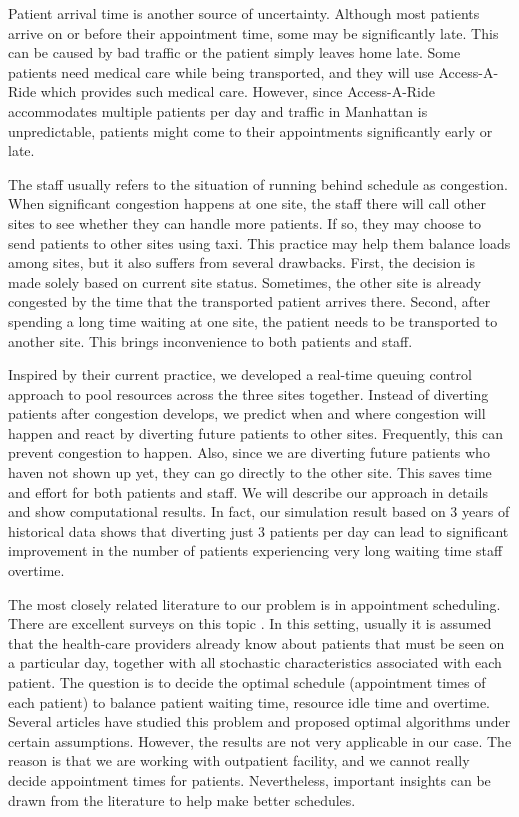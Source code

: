 Patient arrival time is another source of uncertainty. Although most
patients arrive on or before their appointment time, some may be
significantly late. This can be caused by bad traffic or the patient
simply leaves home late. Some patients need medical care while being
transported, and they will use Access-A-Ride which provides
such medical care. However, since Access-A-Ride accommodates
multiple patients per day and traffic in Manhattan is unpredictable,
patients might come to their appointments significantly early or late.

The staff usually refers to the situation of running behind schedule
as congestion. When significant congestion happens at one site, the staff there
will call other sites to see whether they can handle more patients. If so,
 they may choose to send patients to other sites using taxi. This practice
may help them balance loads among sites, but it also suffers from several
drawbacks. First, the decision is made solely based on current site status.
Sometimes, the other site is already congested by the time that the transported patient
arrives there. Second, after spending a long time waiting at one site, the patient
needs to be transported to another site. This brings inconvenience to both
patients and staff.

Inspired by their current practice, we developed a real-time queuing control
approach to pool resources across the three sites together. Instead of diverting
patients after congestion develops, we predict when and where congestion will
happen and react by diverting future patients to other sites. Frequently, this
can prevent congestion to happen. Also, since we are diverting future patients
who haven not shown up yet, they can go directly to the other site. This saves
time and effort for both patients and staff. We will describe our approach
in details and show computational results. In fact, our simulation result
based on 3 years of historical data shows that diverting just 3 patients per
day can lead to significant improvement in the number of patients experiencing
very long waiting time staff overtime.

The most closely related literature to our problem is in appointment scheduling.
There are excellent surveys on this topic \cite{gupta2008appointment, cayirli2003outpatient}.
In this setting, usually it is assumed that the health-care providers
already know about patients that must be seen on a particular day,
together with all stochastic characteristics associated with each patient.
The question is to decide the optimal schedule (appointment times of
each patient) to balance patient waiting time, resource idle time and
overtime. Several articles \cite{kaandorp2007optimal,denton2003sequential,begen2011appointment}
have studied this problem and proposed optimal algorithms under
certain assumptions. However, the results are not very applicable
in our case. The reason is that we are working with outpatient facility,
and we cannot really decide appointment times for patients. Nevertheless,
important insights can be drawn from the literature to help make
better schedules.
